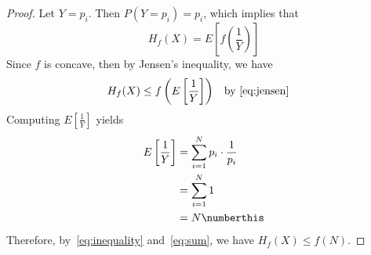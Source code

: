 \documentclass[
  coursecode={MTHE 474},
  assignmentname={Homework \homeworknumber},
  studentnumber=20053722,
  name={Bryan Hoang}
]{
  ltxanswer%
}
\begin{document}
  \begin{questions}
    \setcounter{question}{\questionnumber}
    \addtocounter{question}{-1}
    \question{}
    \begin{solution}
      \begin{parts}
        \part{}
        \begin{proof}
          Let \(Y = p_{i}\). Then \(P(Y=p_{i}) = p_{i}\), which implies that
          \begin{equation}\label{eq:jensen}
            H_{f}(X) = E\left[f\left(\frac{1}{Y}\right)\right]
          \end{equation}
          Since \(f\) is concave, then by Jensen's inequality, we have
          \begin{align}\label{eq:inequality}
            H_{f}(X) &\le  f\left(E\left[\frac{1}{Y}\right]\right) & &\text{by~\eqref{eq:jensen}}
          \end{align}
          Computing \(E\left[\frac{1}{Y}\right]\) yields
          \begin{align*}
            E\left[\frac{1}{Y}\right] &= \sum_{i=1}^{N} p_{i} \cdot \frac{1}{p_{i}} \\
                                      &= \sum_{i=1}^{N} 1                           \\
                                      &= N\numberthis\label{eq:sum}
          \end{align*}
          Therefore, by~\eqref{eq:inequality} and~\eqref{eq:sum}, we have \(H_{f}(X) \le f(N)\).
        \end{proof}

\end{parts}
\end{solution}
\end{questions}
\end{document}
